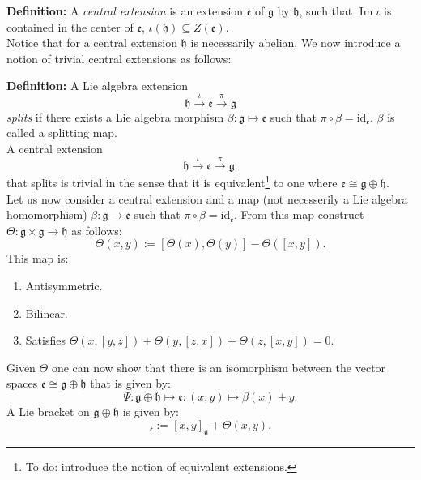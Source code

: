 \documentclass[submission, PhysLectNotes]{SciPost}
\DeclareMathOperator{\Ima}{Im}
\begin{document}
{\bf Definition:} A \emph{central extension} is an extension $\mathfrak{e}$ of $\mathfrak{g}$ by $\mathfrak{h}$, such that $\Ima \iota$ is contained in the center of $\mathfrak{e}$, $\iota(\mathfrak{h})\subseteq Z(\mathfrak{e})$.\\

Notice that for a central extension $\mathfrak{h}$ is necessarily abelian. We now introduce a notion of trivial central extensions as follows:

{\bf Definition:} A Lie algebra extension
\begin{equation}
	\mathfrak{h}\overset{\iota}{\rightarrow}\mathfrak{e}\overset{\pi}{\rightarrow}\mathfrak{g}
\end{equation}
\emph{splits} if there exists a Lie algebra morphism $\beta: \mathfrak{g}\mapsto\mathfrak{e}$ such that $\pi\circ\beta = \text{id}_{\mathfrak{e}}$. $\beta$ is called a splitting map.\\

A central extension
\begin{equation}
	\mathfrak{h}\overset{\iota}{\rightarrow}\mathfrak{e}\overset{\pi}{\rightarrow}\mathfrak{g}.
\end{equation}
that splits is trivial in the sense that it is equivalent\footnote{To do: introduce the notion of equivalent extensions.} to one where $\mathfrak{e}\cong\mathfrak{g}\oplus\mathfrak{h}$.\\

Let us now consider a central extension and a map (not necesserily a Lie algebra homomorphism) $\beta:\mathfrak{g}\rightarrow\mathfrak{e}$ such that $\pi\circ\beta = \text{id}_{\mathfrak{e}}$. From this map construct
$\Theta: \mathfrak{g}\times\mathfrak{g}\rightarrow\mathfrak{h}$ as follows:
\begin{equation}
	\Theta(x,y) := \left[\Theta(x),\Theta(y)\right] - \Theta\left([x,y]\right).
\end{equation}
This map is:
\begin{enumerate}
	\item \label{prop:antisym} Antisymmetric.
	\item \label{prop:bilinear} Bilinear.
	\item \label{prop:Jacobi} Satisfies $\Theta(x,[y,z]) + \Theta(y,[z,x]) + \Theta(z,[x,y]) = 0$.
\end{enumerate}
Given $\Theta$ one can now show that there is an isomorphism between the vector spaces $\mathfrak{e}\cong\mathfrak{g}\oplus\mathfrak{h}$ that is given by:
\begin{equation}
	\Psi:\mathfrak{g}\oplus\mathfrak{h}\mapsto\mathfrak{e}:(x,y)\mapsto\beta(x) + y.
\end{equation}
A Lie bracket on $\mathfrak{g}\oplus\mathfrak{h}$ is given by:
\begin{equation}
	[x\oplus z, y\oplus z']_{\mathfrak{e}} := [x,y]_\mathfrak{g} + \Theta(x,y).
\end{equation}
\end{document}
